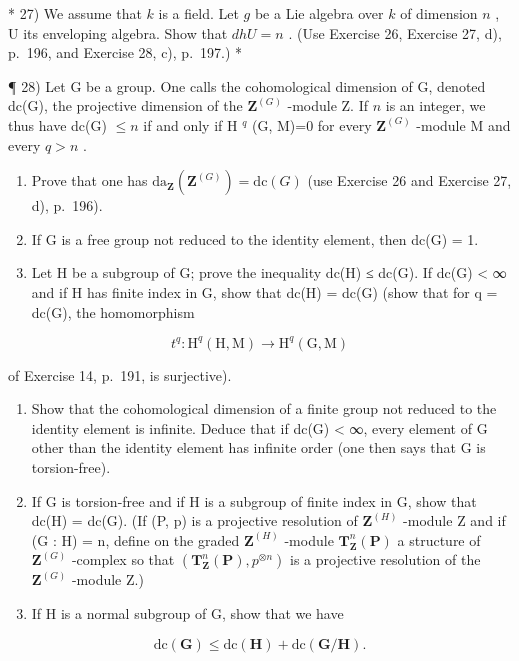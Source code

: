 * 27) We assume that \(k\) is a field. Let \(g\) be a Lie algebra over \(k\) of dimension \(n\) , U its enveloping algebra. Show that \(dhU = n\) . (Use Exercise 26, Exercise 27, d), p.~196, and Exercise 28, c), p.~197.) *

¶ 28) Let G be a group. One calls the cohomological dimension of G, denoted dc(G), the projective dimension of the \(\mathbf{Z}^{(G)}\) -module Z. If \(n\) is an integer, we thus have dc(G) \(\leqslant n\) if and only if H \(^{q}\) (G, M)=0 for every \(\mathbf{Z}^{(G)}\) -module M and every \(q > n\) .

\begin{enumerate}
\def\labelenumi{\alph{enumi})}
\item
  Prove that one has \(\mathrm{da}_{\mathbf{Z}}(\mathbf{Z}^{(G)}) = \mathrm{dc}(G)\) (use Exercise 26 and Exercise 27, d), p.~196).
\item
  If G is a free group not reduced to the identity element, then dc(G) = 1.
\item
  Let H be a subgroup of G; prove the inequality dc(H) ≤ dc(G). If dc(G) \textless{} ∞ and if H has finite index in G, show that dc(H) = dc(G) (show that for q = dc(G), the homomorphism
\end{enumerate}

\[
t ^ {q}: \mathrm{H} ^ {q} (\mathrm{H}, \mathrm{M}) \rightarrow \mathrm{H} ^ {q} (\mathrm{G}, \mathrm{M})
\]

of Exercise 14, p.~191, is surjective).

\begin{enumerate}
\def\labelenumi{\alph{enumi})}
\setcounter{enumi}{3}
\item
  Show that the cohomological dimension of a finite group not reduced to the identity element is infinite. Deduce that if dc(G) \textless{} ∞, every element of G other than the identity element has infinite order (one then says that G is torsion-free).
\item
  If G is torsion-free and if H is a subgroup of finite index in G, show that dc(H) = dc(G). (If (P, p) is a projective resolution of \(\mathbf{Z}^{(H)}\) -module Z and if (G : H) = n, define on the graded \(\mathbf{Z}^{(H)}\) -module \(\mathbf{T}_{\mathbf{Z}}^{n}(\mathbf{P})\) a structure of \(\mathbf{Z}^{(G)}\) -complex so that \((\mathbf{T}_{\mathbf{Z}}^{n}(\mathbf{P}), p^{\otimes n})\) is a projective resolution of the \(\mathbf{Z}^{(G)}\) -module Z.)
\item
  If H is a normal subgroup of G, show that we have
\end{enumerate}

\[
\mathrm{dc} (\mathbf {G}) \leqslant \mathrm{dc} (\mathbf {H}) + \mathrm{dc} (\mathbf {G} / \mathbf {H}).
\]

